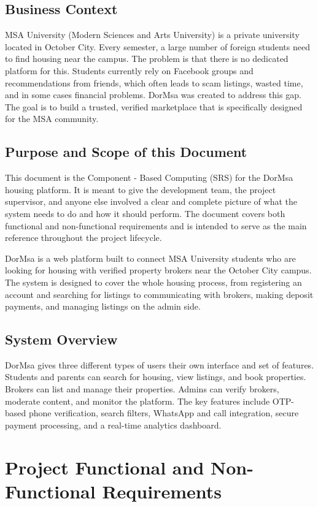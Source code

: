\documentclass[12pt,a4paper]{article}
\begin{document}
\subsection{Business Context}
MSA University (Modern Sciences and Arts University) is a private university located in October City. Every semester, a large number of foreign students need to find housing near the campus. The problem is that there is no dedicated platform for this. Students currently rely on Facebook groups and recommendations from friends, which often leads to scam listings, wasted time, and in some cases financial problems. DorMsa was created to address this gap. The goal is to build a trusted, verified marketplace that is specifically designed for the MSA community.

\subsection{Purpose and Scope of this Document}
This document is the Component - Based Computing (SRS) for the DorMsa housing platform. It is meant to give the development team, the project supervisor, and anyone else involved a clear and complete picture of what the system needs to do and how it should perform. The document covers both functional and non-functional requirements and is intended to serve as the main reference throughout the project lifecycle.

DorMsa is a web platform built to connect MSA University students who are looking for housing with verified property brokers near the October City campus. The system is designed to cover the whole housing process, from registering an account and searching for listings to communicating with brokers, making deposit payments, and managing listings on the admin side.

\subsection{System Overview}
DorMsa gives three different types of users their own interface and set of features. Students and parents can search for housing, view listings, and book properties. Brokers can list and manage their properties. Admins can verify brokers, moderate content, and monitor the platform. The key features include OTP-based phone verification, search filters, WhatsApp and call integration, secure payment processing, and a real-time analytics dashboard.

\newpage
\section{Project Functional and Non-Functional Requirements}
\end{document}
